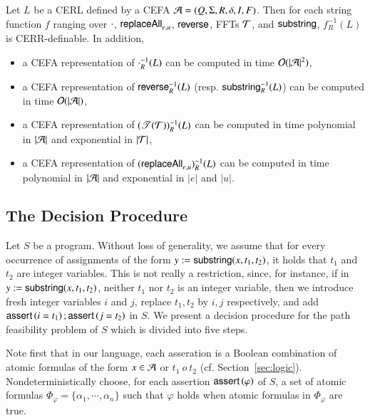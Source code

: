 \begin{proposition}\label{prop:pre-image}
Let $L$ be a CERL defined by a CEFA $\mathcal{A} = (Q, \Sigma, R, \delta, I, F)$. Then for each string function $f$ ranging over $\cdot$, $\mathsf{replaceAll}_{e,u}$, $\mathsf{reverse}$, FFTs $\mathcal{T}$, and $\mathsf{substring}$, $f^{-1}_R(L)$ is CERR-definable. In addition,
\begin{itemize}
\item a CEFA representation of $\cdot^{-1}_R(L)$ can be computed in time $\mathcal{O}(|\mathcal{A}|^2)$, 
%
\item a CEFA representation of $\mathsf{reverse}^{-1}_R(L)$ (resp. $\mathsf{substring}^{-1}_R(L)$) can be computed in time $\mathcal{O}(|\mathcal{A}|)$,
%
\item a CEFA representation of  $(\mathscr{T}(\mathcal{T}))^{-1}_R(L)$ can be computed in time polynomial in $|\mathcal{A}|$ and exponential in $|\mathcal{T}|$,
%
\item a CEFA representation of  $(\mathsf{replaceAll}_{e,u})^{-1}_R(L)$ can be computed in time polynomial in $|\mathcal{A}|$ and exponential in $|e|$ and $|u|$.
\end{itemize}
\end{proposition}



\subsection{The Decision Procedure}\label{sec:dc}
%
Let $S$  be a {\slint} program. %
Without loss of generality, we assume that for every occurrence of assignments of the form $y:= \mathsf{substring}(x, t_1, t_2)$, it holds that $t_1$ and $t_2$ are integer variables. This is not really a restriction, since, for instance, if in $y:= \mathsf{substring}(x, t_1, t_2)$, neither $t_1$ nor $t_2$ is an integer variable, then we introduce fresh integer variables $i$ and $j$, replace $t_1, t_2$ by $i,j$ respectively, and add $\textsf{assert}\left(i=t_1\right);\textsf{assert}\left(j = t_2\right)$ in $S$.
We present a decision procedure for the path feasibility problem of $S$ which is divided into five steps. %
%

\medskip
{}%

\smallskip
Note first that in our language, each asseration is a Boolean combination of atomic formulas of the form $x\in \mathcal{A}$ or $t_1\ o\ t_2$ (cf. Section~\ref{sec:logic}).  
Nondeterministically choose, for each assertion $\textsf{assert}\left(\varphi\right)$ of $S$, a set of atomic formulas $\Phi_\varphi = \{\alpha_1,\cdots,\alpha_n\}$ such that $\varphi$ holds when atomic formulas in $\Phi_\varphi$ are true.  %

